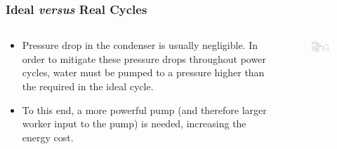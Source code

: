 \documentclass[10pt,compress]{beamer}
\begin{document}
\begin{frame}
 \frametitle{Ideal {\it versus} Real Cycles}
  \begin{columns}

   \begin{column}[c]{0.4\linewidth}
      \begin{itemize}%
      \item <1-> Pressure drop in the condenser is usually negligible. In order to mitigate these pressure drops throughout power cycles, water must be pumped to a pressure higher than the required in the ideal cycle. 
      \item <2-> To this end, a more powerful pump (and therefore larger worker input to the pump) is needed, increasing the energy cost.  
    \end{itemize}
   \end{column}
   \begin{column}[c]{0.6\linewidth}
    \begin{figure}%
     \begin{center}
      \includegraphics[width=7.5cm,clip]{./Pics/Rankine_vs_Real}
     \end{center}
    \end{figure}  
   \end{column}

  \end{columns}
 \normalsize
\end{frame}
\end{document}
